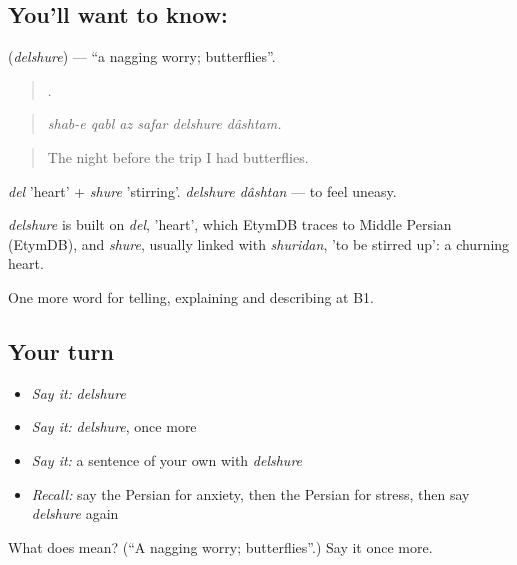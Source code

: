 \subsection*{You'll want to know: }
\textbf{} (\emph{delshure}) — \textquotedblleft{}a nagging worry; butterflies\textquotedblright{}.

\begin{quote}
     .
\end{quote}

\begin{quote}
\emph{shab-e qabl az safar delshure dâshtam.}
\end{quote}

\begin{quote}
The night before the trip I had butterflies.
\end{quote}

\emph{del} 'heart' + \emph{shure} 'stirring'. \emph{delshure dâshtan} — to feel uneasy.

\begin{cousinweb}
\emph{delshure} is built on \emph{del}, 'heart', which EtymDB traces to Middle Persian (EtymDB), and \emph{shure}, usually linked with \emph{shuridan}, 'to be stirred up': a churning heart.
\end{cousinweb}

\begin{grammarlens}[title={What you've built}]
One more word for telling, explaining and describing at B1.
\end{grammarlens}

\subsection*{Your turn}
\begin{itemize}
\raggedright
  \item \emph{Say it:} \emph{delshure}
  \item \emph{Say it:} \emph{delshure}, once more
  \item \emph{Say it:} a sentence of your own with \emph{delshure}
  \item \emph{Recall:} say the Persian for anxiety, then the Persian for stress, then say \emph{delshure} again
\end{itemize}

\begin{tcolorbox}[breakable,colback=teal!4,colframe=teal!35!black,title={Before you move on}]
What does  mean? (\textquotedblleft{}A nagging worry; butterflies\textquotedblright{}.) Say it once more.
\end{tcolorbox}
